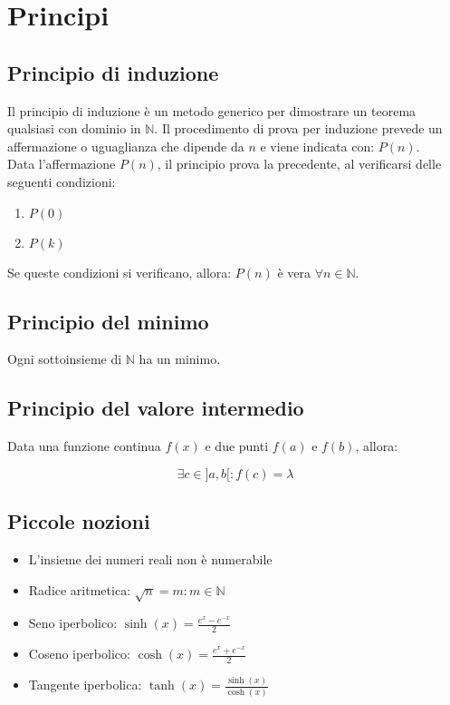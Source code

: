 \documentclass{article}
\begin{document}
\section{Principi}

\subsection{Principio di induzione}

Il principio di induzione è un metodo generico per dimostrare un teorema qualsiasi con dominio in $\mathbb{N}$.
Il procedimento di prova per induzione prevede un affermazione o uguaglianza che dipende da $n$ e viene indicata con: $P(n)$.\\

\noindent
Data l'affermazione $P(n)$, il principio prova la precedente, al verificarsi delle seguenti condizioni:

\begin{enumerate}
    \item $P(0)$
    \item $P(k)$
\end{enumerate}

\noindent
Se queste condizioni si verificano, allora: $P(n)$ è vera $\forall n \in \mathbb{N}$.

\subsection{Principio del minimo}

Ogni sottoinsieme di $\mathbb{N}$ ha un minimo.

\subsection{Principio del valore intermedio}

Data una funzione continua $f(x)$ e due punti $f(a)$ e $f(b)$, allora:

$$
\exists c \in ] a, b [ : f(c) = \lambda
$$

\subsection{Piccole nozioni}

\begin{itemize}
    \item L'insieme dei numeri reali non è numerabile
    \item Radice aritmetica: $\sqrt{n} = m : m \in \mathbb{N}$
    \item Seno iperbolico: $\sinh(x) = \frac{e^x - e^{-x}}{2}$
    \item Coseno iperbolico: $\cosh(x) = \frac{e^x + e^{-x}}{2}$
    \item Tangente iperbolica: $\tanh(x) = \frac{\sinh(x)}{\cosh(x)}$
\end{itemize}
\end{document}
